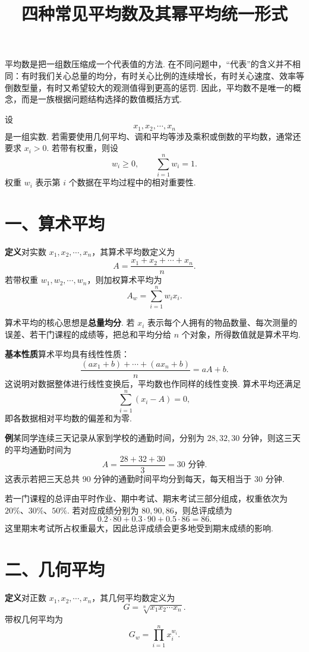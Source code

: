 \documentclass[UTF8, 12pt, fontset=fandol, oneside]{ctexart}
\title{四种常见平均数及其幂平均统一形式}
\author{}
\date{}
\begin{document}
\maketitle

平均数是把一组数压缩成一个代表值的方法. 在不同问题中，``代表''的含义并不相同：有时我们关心总量的均分，有时关心比例的连续增长，有时关心速度、效率等倒数型量，有时又希望较大的观测值得到更高的惩罚. 因此，平均数不是唯一的概念，而是一族根据问题结构选择的数值概括方式.

设
\[
  x_1,x_2,\cdots,x_n
\]
是一组实数. 若需要使用几何平均、调和平均等涉及乘积或倒数的平均数，通常还要求 $x_i>0$. 若带有权重，则设
\[
  w_i\ge0,\qquad \sum_{i=1}^n w_i=1.
\]
权重 $w_i$ 表示第 $i$ 个数据在平均过程中的相对重要性.

\section*{一、算术平均}

\noindent\textbf{定义}\quad 对实数 $x_1,x_2,\cdots,x_n$，其算术平均数定义为
\[
  A=\frac{x_1+x_2+\cdots+x_n}{n}.
\]
若带权重 $w_1,w_2,\cdots,w_n$，则加权算术平均为
\[
  A_w=\sum_{i=1}^n w_i x_i.
\]

算术平均的核心思想是\textbf{总量均分}. 若 $x_i$ 表示每个人拥有的物品数量、每次测量的误差、若干门课程的成绩等，把总和平均分给 $n$ 个对象，所得数值就是算术平均.

\noindent\textbf{基本性质}\quad 算术平均具有线性性质：
\[
  \frac{(ax_1+b)+\cdots+(ax_n+b)}{n}
  =aA+b.
\]
这说明对数据整体进行线性变换后，平均数也作同样的线性变换. 算术平均还满足
\[
  \sum_{i=1}^n (x_i-A)=0,
\]
即各数据相对平均数的偏差和为零.

\noindent\textbf{例}\quad 某同学连续三天记录从家到学校的通勤时间，分别为 $28,32,30$ 分钟，则这三天的平均通勤时间为
\[
  A=\frac{28+32+30}{3}=30\text{ 分钟}.
\]
这表示若把三天总共 $90$ 分钟的通勤时间平均分到每天，每天相当于 $30$ 分钟.

若一门课程的总评由平时作业、期中考试、期末考试三部分组成，权重依次为 $20\%$、$30\%$、$50\%$. 若对应成绩分别为 $80,90,86$，则总评成绩为
\[
  0.2\cdot80+0.3\cdot90+0.5\cdot86=86.
\]
这里期末考试所占权重最大，因此总评成绩会更多地受到期末成绩的影响.

\section*{二、几何平均}

\noindent\textbf{定义}\quad 对正数 $x_1,x_2,\cdots,x_n$，其几何平均数定义为
\[
  G=\sqrt[n]{x_1x_2\cdots x_n}.
\]
带权几何平均为
\[
  G_w=\prod_{i=1}^n x_i^{w_i}.
\]
\end{document}
